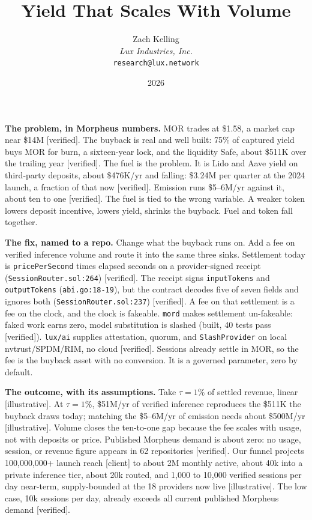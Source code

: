 \documentclass[11pt,a4paper]{article}
\title{Yield That Scales With Volume}
\author{Zach Kelling\\\textit{Lux Industries, Inc.}\\\texttt{research@lux.network}}
\date{2026}
\newcommand{\code}[1]{\texttt{\small #1}}
\begin{document}
\luxcoverpage
\sloppy


\noindent\textbf{The problem, in Morpheus numbers.}
MOR trades at \$1.58, a market cap near \$14M [verified]. The buyback is real and well built:
75\% of captured yield buys MOR for burn, a sixteen-year lock, and the liquidity Safe, about
\$511K over the trailing year [verified]. The fuel is the problem. It is Lido and Aave yield on
third-party deposits, about \$476K/yr and falling: \$3.24M per quarter at the 2024 launch, a
fraction of that now [verified]. Emission runs \$5--6M/yr against it, about ten to one
[verified]. The fuel is tied to the wrong variable. A weaker token lowers deposit incentive,
lowers yield, shrinks the buyback. Fuel and token fall together.

\noindent\textbf{The fix, named to a repo.}
Change what the buyback runs on. Add a fee on verified inference volume and route it into the
same three sinks. Settlement today is \code{pricePerSecond} times elapsed seconds on a
provider-signed receipt (\code{SessionRouter.sol:264}) [verified]. The receipt signs
\code{inputTokens} and \code{outputTokens} (\code{abi.go:18-19}), but the contract decodes five
of seven fields and ignores both (\code{SessionRouter.sol:237}) [verified]. A fee on that
settlement is a fee on the clock, and the clock is fakeable. \code{mord} makes settlement
un-fakeable: faked work earns zero, model substitution is slashed (built, 40 tests pass
[verified]). \code{lux/ai} supplies attestation, quorum, and \code{SlashProvider} on local
nvtrust/SPDM/RIM, no cloud [verified]. Sessions already settle in MOR, so the fee is the
buyback asset with no conversion. It is a governed parameter, zero by default.

\noindent\textbf{The outcome, with its assumptions.}
Take $\tau = 1\%$ of settled revenue, linear [illustrative]. At $\tau = 1\%$, \$51M/yr of
verified inference reproduces the \$511K the buyback draws today; matching the \$5--6M/yr of
emission needs about \$500M/yr [illustrative]. Volume closes the ten-to-one gap because the fee
scales with usage, not with deposits or price. Published Morpheus demand is about zero: no
usage, session, or revenue figure appears in 62 repositories [verified]. Our funnel projects
100,000,000+ launch reach [client] to about 2M monthly active, about 40k into a private
inference tier, about 20k routed, and 1,000 to 10,000 verified sessions per day near-term,
supply-bounded at the 18 providers now live [illustrative]. The low case, 10k sessions per day,
already exceeds all current published Morpheus demand [verified].
\end{document}
